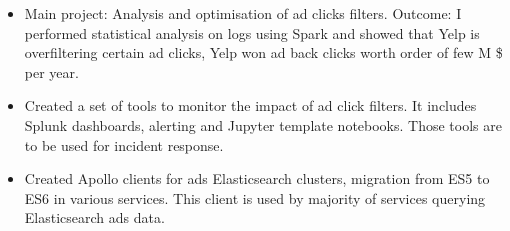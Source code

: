 \documentclass[10pt,a4paper,ragged2e]{altacv}
\begin{document}

\begin{fullwidth}
\makecvheader
\end{fullwidth}



\begin{itemize}
\item Main project: Analysis and optimisation of ad clicks filters. Outcome: I performed statistical analysis on logs using Spark and showed that Yelp is overfiltering certain ad clicks, Yelp won ad back clicks worth order of few M \$ per year.
\smallskip
\item Created a set of tools to monitor the impact of ad click filters. It includes Splunk dashboards, alerting and Jupyter template notebooks. Those tools are to be used for incident response.
\smallskip
\item Created Apollo clients for ads Elasticsearch clusters, migration from ES5 to ES6 in various services. This client is used by majority of services querying Elasticsearch ads data.
\end{itemize}

\divider
\end{document}
